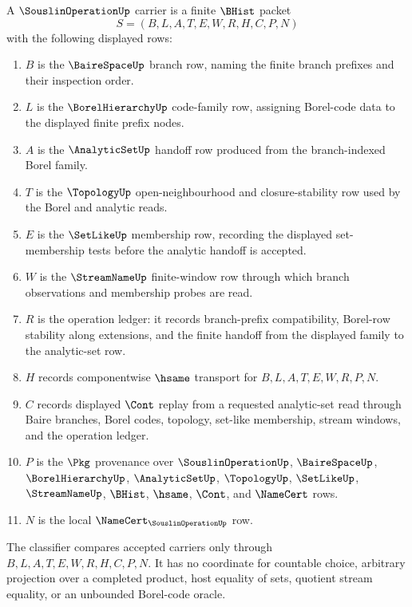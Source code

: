 \begin{definition}
\label{def:souslin-operation-carrier}
A $\SouslinOperationUp$ carrier is a finite $\BHist$ packet
$$
S=(B,L,A,T,E,W,R,H,C,P,N)
$$
with the following displayed rows:
\begin{enumerate}
\item $B$ is the $\BaireSpaceUp$ branch row, naming the finite branch prefixes and their inspection order.
\item $L$ is the $\BorelHierarchyUp$ code-family row, assigning Borel-code data to the displayed finite prefix nodes.
\item $A$ is the $\AnalyticSetUp$ handoff row produced from the branch-indexed Borel family.
\item $T$ is the $\TopologyUp$ open-neighbourhood and closure-stability row used by the Borel and analytic reads.
\item $E$ is the $\SetLikeUp$ membership row, recording the displayed set-membership tests before the analytic handoff is accepted.
\item $W$ is the $\StreamNameUp$ finite-window row through which branch observations and membership probes are read.
\item $R$ is the operation ledger: it records branch-prefix compatibility, Borel-row stability along extensions, and the finite handoff from the displayed family to the analytic-set row.
\item $H$ records componentwise $\hsame$ transport for $B,L,A,T,E,W,R,P,N$.
\item $C$ records displayed $\Cont$ replay from a requested analytic-set read through Baire branches, Borel codes, topology, set-like membership, stream windows, and the operation ledger.
\item $P$ is the $\Pkg$ provenance over $\SouslinOperationUp$, $\BaireSpaceUp$, $\BorelHierarchyUp$, $\AnalyticSetUp$, $\TopologyUp$, $\SetLikeUp$, $\StreamNameUp$, $\BHist$, $\hsame$, $\Cont$, and $\NameCert$ rows.
\item $N$ is the local $\NameCert_{\SouslinOperationUp}$ row.
\end{enumerate}
The classifier compares accepted carriers only through $B,L,A,T,E,W,R,H,C,P,N$. It has no coordinate for countable choice, arbitrary projection over a completed product, host equality of sets, quotient stream equality, or an unbounded Borel-code oracle.
\end{definition}

